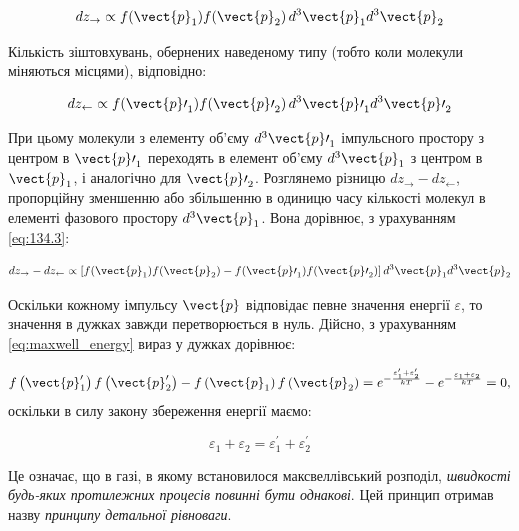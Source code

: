 \begin{equation}
dz_{\rightarrow} \propto f({\vect{p}}_1) f({\vect{p}}_2) \, d^3{\vect{p}}_1 d^3{\vect{p}}_2
\label{eq:134.4}
\end{equation}

Кількість зіштовхувань, обернених наведеному типу (тобто коли молекули міняються місцями), відповідно:

\begin{equation}
dz_{\leftarrow} \propto f({\vect{p}\prime}_1) f({\vect{p}\prime}_2) \, d^3{\vect{p}\prime}_1 d^3{\vect{p}\prime}_2
\label{eq:134.5}
\end{equation}

При цьому молекули з елементу об'єму $d^3{\vect{p}\prime}_1$ імпульсного простору з центром в ${\vect{p}\prime}_1$ переходять в елемент об’єму $d^3{\vect{p}}_1$ з центром в ${\vect{p}}_1$, і аналогічно для ${\vect{p}\prime}_2$.
Розглянемо різницю $dz_{\rightarrow} - dz_{\leftarrow}$, пропорційну зменшенню або збільшенню в одиницю часу кількості молекул в елементі фазового простору $d^3{\vect{p}}_1$. Вона дорівнює, з урахуванням \eqref{eq:134.3}:

\begin{equation}
dz_{\rightarrow} - dz_{\leftarrow} \propto \left[ f({\vect{p}}_1) f({\vect{p}}_2) - f({\vect{p}\prime}_1) f({\vect{p}\prime}_2) \right] d^3{\vect{p}}_1 d^3{\vect{p}}_2
\label{eq:134.6}
\end{equation}

Оскільки кожному імпульсу ${\vect{p}}$ відповідає певне значення енергії $\varepsilon$, то значення в дужках завжди перетворюється в нуль.
Дійсно, з урахуванням \eqref{eq:maxwell_energy} вираз у дужках дорівнює:

\begin{equation*}
    f\left(\vect{p}'_1\right)f\left(\vect{p}'_2\right)-f\left({\vect{p}}_1\right)f\left({\vect{p}}_2\right)=e^{-\frac{\varepsilon'_1+\varepsilon'_2}{kT}}-e^{-\frac{\varepsilon_1+\varepsilon_2}{kT}}=0,
\end{equation*}
оскільки в силу закону збереження енергії маємо:

\begin{equation}
\varepsilon_1 + \varepsilon_2 = \varepsilon_1^{\prime} + \varepsilon_2^{\prime}
\label{eq:134.7}
\end{equation}

Це означає, що в газі, в якому встановилося максвеллівський розподіл, \emph{швидкості будь-яких протилежних процесів повинні бути однакові}. Цей принцип отримав назву \emph{принципу детальної рівноваги}.

